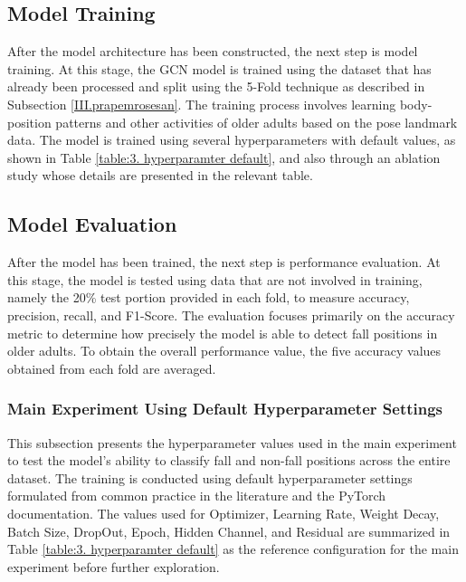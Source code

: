 \documentclass[10pt,TimesNewRoman,a4paper]{matrikenglish}
\begin{document}
\subsection{Model Training} \label{III.pelatihan}

After the model architecture has been constructed, the next step is model training. At this stage, the GCN model is trained using the dataset that has already been processed and split using the 5-Fold technique as described in Subsection \ref{III.prapemrosesan}. The training process involves learning body-position patterns and other activities of older adults based on the pose landmark data. The model is trained using several hyperparameters with default values, as shown in Table \ref{table:3. hyperparamter default}, and also through an ablation study whose details are presented in the relevant table. \par

\subsection{Model Evaluation} \label{III.evaluasi}

After the model has been trained, the next step is performance evaluation. At this stage, the model is tested using data that are not involved in training, namely the 20\% test portion provided in each fold, to measure accuracy, precision, recall, and F1-Score. The evaluation focuses primarily on the accuracy metric to determine how precisely the model is able to detect fall positions in older adults. To obtain the overall performance value, the five accuracy values obtained from each fold are averaged. \par

\subsubsection{Main Experiment Using Default Hyperparameter Settings} \label{III.evaluasi default}

This subsection presents the hyperparameter values used in the main experiment to test the model’s ability to classify fall and non-fall positions across the entire dataset. The training is conducted using default hyperparameter settings formulated from common practice in the literature and the PyTorch documentation. The values used for Optimizer, Learning Rate, Weight Decay, Batch Size, DropOut, Epoch, Hidden Channel, and Residual are summarized in Table \ref{table:3. hyperparamter default} as the reference configuration for the main experiment before further exploration.
\end{document}
